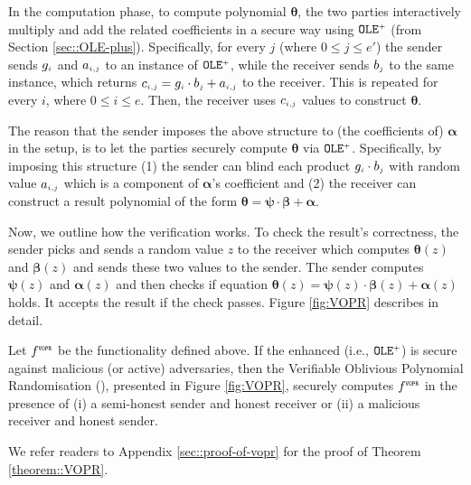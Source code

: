 In the computation phase,  to compute polynomial $\bm\theta$, the two parties interactively multiply and add the related coefficients in a secure way using $\mathtt{OLE}^{\scriptscriptstyle +}$ (from Section \ref{sec::OLE-plus}). Specifically,
%
%
for every $j$  (where $0\leq j\leq e'$) the sender sends $g_{\scriptscriptstyle i}$ and $a_{\scriptscriptstyle i,j}$ to an instance of  $\mathtt{OLE}^{\scriptscriptstyle +}$, while the receiver sends $b_{\scriptscriptstyle j}$ to the same instance,  which returns $c_{\scriptscriptstyle i,j}=g_{\scriptscriptstyle i}\cdot b_{\scriptscriptstyle j}+ a_{\scriptscriptstyle i,j}$ to the receiver. This is repeated for every $i$, where $0 \leq i \leq e$. Then, the receiver uses $c_{\scriptscriptstyle i,j}$ values to construct $\bm\theta$.  


The reason that the sender imposes the above structure to (the coefficients of)  $\bm\alpha$ in the setup, is to let the parties securely compute $\bm\theta$ via  $\mathtt{OLE}^{\scriptscriptstyle +}$. Specifically, by imposing this structure (1) the sender  can blind each product $g_{\scriptscriptstyle i}\cdot b_{\scriptscriptstyle j}$  with  random value $a_{\scriptscriptstyle i,j}$ which is a component of $\bm\alpha$'s coefficient and (2) the receiver can construct a result polynomial of the form $\bm\theta=\bm\psi\cdot \bm\beta+\bm\alpha$. 


Now, we outline how the verification works. To check the result's correctness, the sender picks and sends a random value $z$ to the receiver which computes  $\bm\theta(z)$ and $\bm\beta(z)$ and sends these two values  to the sender. The sender computes  $\bm\psi(z)$ and $\bm\alpha(z)$ and then checks if equation  $\bm\theta({ z})=\bm\psi({ z})\cdot \bm\beta({ z})+\bm\alpha({ z})$ holds. It accepts the result if the check passes.   Figure \ref{fig:VOPR} describes \vopr in detail.

\vs
\vs

\vs
\vs

\begin{theorem}\label{theorem::VOPR}
%
Let $f^{\scriptscriptstyle \mathtt{VOPR}}$ be the functionality defined above. If the enhanced \ole (i.e., $\mathtt{OLE}^{\scriptscriptstyle +}$) is secure against malicious (or active) adversaries, then the  Verifiable Oblivious Polynomial Randomisation (\vopr), presented in Figure \ref{fig:VOPR}, securely computes $f^{\scriptscriptstyle \mathtt{VOPR}}$ in the presence of (i) a semi-honest sender and honest receiver or (ii) a malicious receiver and honest sender. 
%
\end{theorem}

\svs
We refer readers to Appendix \ref{sec::proof-of-vopr} for the proof of Theorem \ref{theorem::VOPR}.




%

